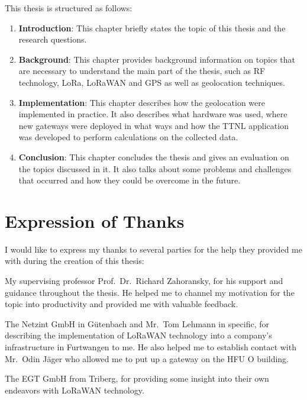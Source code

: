 This thesis is structured as follows:

\begin{enumerate}
      \item \textbf{Introduction}:
            This chapter briefly states the topic of this thesis and the research questions.
      \item \textbf{Background}:
            This chapter provides background information on topics that are necessary to understand the main part of the thesis, such as \ac{RF} technology, \ac{LoRa}, \ac{LoRaWAN} and \ac{GPS} as well as geolocation techniques.
      \item \textbf{Implementation}:
            This chapter describes how the geolocation were implemented in practice.
            It also describes what hardware was used, where new gateways were deployed in what ways and how the \ac{TTNL} application was developed to perform calculations on the collected data.
      \item \textbf{Conclusion}:
            This chapter concludes the thesis and gives an evaluation on the topics discussed in it.
            It also talks about some problems and challenges that occurred and how they could be overcome in the future.
\end{enumerate}


\section{Expression of Thanks}\label{sec:expression-of-thanks}

I would like to express my thanks to several parties for the help they provided me with during the creation of this thesis:

My supervising professor Prof.\ Dr.\ Richard Zahoransky, for his support and guidance throughout the thesis.
He helped me to channel my motivation for the topic into productivity and provided me with valuable feedback.

The Netzint GmbH in Gütenbach and Mr.\ Tom Lehmann in specific, for describing the implementation of \ac{LoRaWAN} technology into a company's infrastructure in Furtwangen to me.
He also helped me to establish contact with Mr.\ Odin Jäger who allowed me to put up a gateway on the \ac{HFU} O building.

The EGT GmbH from Triberg, for providing some insight into their own endeavors with \ac{LoRaWAN} technology.

